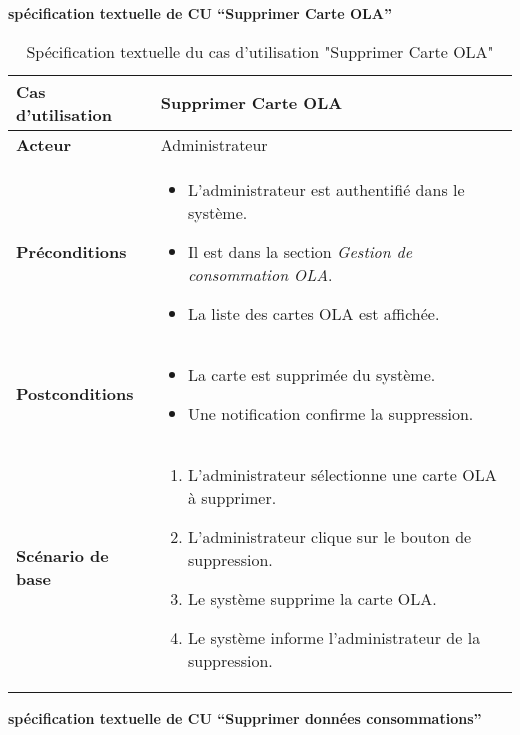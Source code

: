 \documentclass[a4paper,11pt]{report}
\begin{document}
\textbf{spécification textuelle de CU “Supprimer Carte OLA”
}



\begin{table}[H]
  \centering
  \renewcommand{\arraystretch}{1.5}
  \caption{Spécification textuelle du cas d'utilisation "Supprimer Carte OLA"}
  \begin{tabularx}{\textwidth}{|l|X|}
    \hline
    \textbf{Cas d'utilisation} & Supprimer Carte OLA \\ \hline
    \textbf{Acteur} & Administrateur \\ \hline
    \textbf{Préconditions} & 
    \begin{itemize}
      \item L’administrateur est authentifié dans le système.
      \item Il est dans la section \textit{Gestion de consommation OLA}.
      \item La liste des cartes OLA est affichée.
    \end{itemize} \\ \hline
    \textbf{Postconditions} & 
    \begin{itemize}
      \item La carte est supprimée du système.
      \item Une notification confirme la suppression.
    \end{itemize} \\ \hline
    \textbf{Scénario de base} & 
    \begin{enumerate}
      \item L’administrateur sélectionne une carte OLA à supprimer.
      \item L’administrateur clique sur le bouton de suppression.
      \item Le système supprime la carte OLA.
      \item Le système informe l’administrateur de la suppression.
    \end{enumerate} \\ \hline
  \end{tabularx}
\end{table}





\textbf{spécification textuelle de CU “Supprimer données consommations”
}
\end{document}
